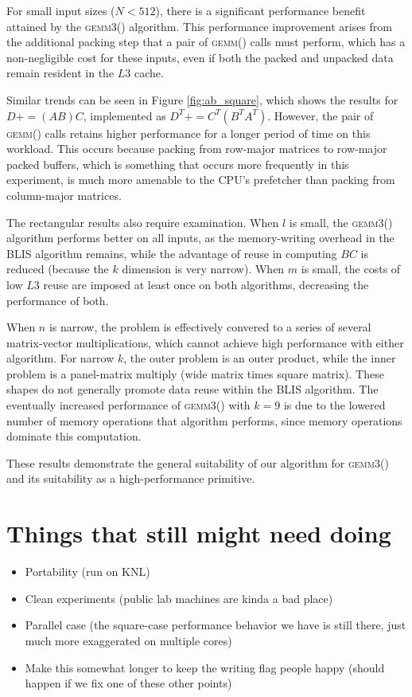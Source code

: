 \documentclass[12pt]{article}
\newcommand*{\pluseq}{\mathrel{{+}{=}}}
\newcommand*{\gemmt}{{\textsc{gemm3()}}}
\newcommand*{\gemm}{{\textsc{gemm()}}}
\begin{document}
For small input sizes ($N < 512$), there is a significant performance benefit attained by the \gemmt{} algorithm.
This performance improvement arises from the additional packing step that a pair of \gemm{} calls must perform, which has a non-negligible cost for these inputs, even if both the packed and unpacked data remain resident in the $L3$ cache.

Similar trends can be seen in Figure \ref{fig:ab_square}, which shows the results for $D \pluseq (AB)C$, implemented as $D^T \pluseq C^T(B^TA^T)$.
However, the pair of \gemm{} calls retains higher performance for a longer period of time on this workload.
This occurs because packing from row-major matrices to row-major packed buffers, which is something that occurs more frequently in this experiment, is much more amenable to the CPU's prefetcher than packing from column-major matrices.

The rectangular results also require examination.
When $l$ is small, the \gemmt{} algorithm performs better on all inputs, as the memory-writing overhead in the BLIS algorithm remains, while the advantage of reuse in computing $BC$ is reduced (because the $k$ dimension is very narrow).
When $m$ is small, the costs of low $L3$ reuse are imposed at least once on both algorithms, decreasing the performance of both.

When $n$ is narrow, the problem is effectively convered to a series of several matrix-vector multiplications, which cannot achieve high performance with either algorithm.
For narrow $k$, the outer problem is an outer product, while the inner problem is a panel-matrix multiply (wide matrix times square matrix).
These shapes do not generally promote data reuse within the BLIS algorithm.
The eventually increased performance of \gemmt{} with $k = 9$ is due to the lowered number of memory operations that algorithm performs, since memory operations dominate this computation.

These results demonstrate the general suitability of our algorithm for \gemmt{} and its suitability as a high-performance primitive.

\section{Things that still might need doing}
\begin{itemize}
\item Portability (run on KNL)
\item Clean experiments (public lab machines are kinda a bad place)
\item Parallel case (the square-case performance behavior we have is still there, just much more exaggerated on multiple cores)
\item Make this somewhat longer to keep the writing flag people happy (should happen if we fix one of these other points)
\end{itemize}
\printbibliography{}
\end{document}
